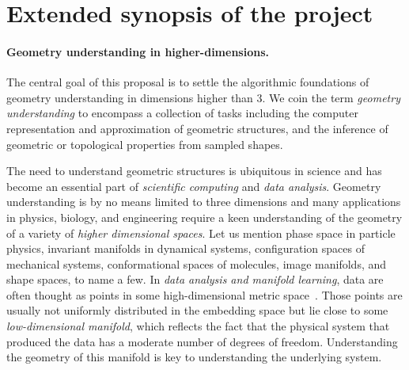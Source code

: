 \section{Extended synopsis of the project}

\paragraph{Geometry understanding in higher-dimensions.} 

The central goal of this proposal is to settle the algorithmic
foundations of geometry understanding in dimensions higher than 3.  We
coin the term {\em geometry understanding} to encompass a collection
of tasks including the computer representation and approximation
of geometric structures, and the inference of geometric or topological
properties from sampled
shapes.  %

The need to understand geometric structures is ubiquitous in science
and has become an essential part of {\em scientific computing} and
{\em data analysis}. %
Geometry understanding is by no means limited to
three dimensions and many applications in physics, biology, and
engineering require a keen understanding of the geometry of a variety
of {\em higher dimensional spaces}. Let us mention phase space in particle
physics, invariant manifolds in dynamical systems, configuration
spaces of mechanical systems, conformational spaces of molecules,
image manifolds, and shape spaces, to name a few. In {\em data analysis and manifold learning}, data are often thought as points in some high-dimensional metric space~\cite{dld-hdda-2000}. Those points are usually not uniformly distributed in the embedding space but lie close to some {\em low-dimensional manifold}, which reflects the fact that the physical system that produced the data has a moderate number of degrees of freedom.  
Understanding the geometry of this manifold is key to understanding the underlying system.

